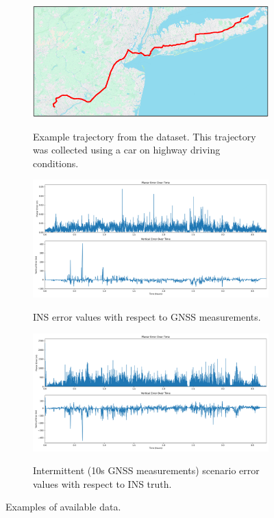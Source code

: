 \documentclass[sageh,times]{sagej}
\begin{document}
\begin{figure}
  \centering
  \begin{subfigure}{\textwidth}
    \includegraphics[width=\textwidth]{images/route.png}
    \label{fig:truth_route}
    \caption{Example trajectory from the dataset. This trajectory was collected using a car on highway driving conditions.}
  \end{subfigure}
  \begin{subfigure}{\textwidth}
    \includegraphics[width=\textwidth]{images/example_truth_error.png}
    \label{fig:truth_route_3d}
    \caption{INS error values with respect to GNSS measurements.}
  \end{subfigure}
  \begin{subfigure}{\textwidth}
    \includegraphics[width=\textwidth]{images/example_inter_error.png}
    \label{fig:inter_route_3d}
    \caption{Intermittent (10s GNSS measurements) scenario error values with respect to INS truth.}
  \end{subfigure}
  \caption{Examples of available data.}
  \label{fig:example_data}
\end{figure}
\end{document}
